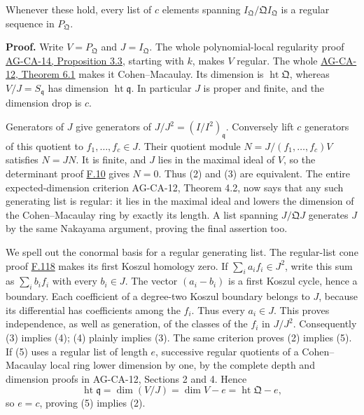 \documentclass[11pt,a4paper,openany]{report}
\begin{document}
Whenever these hold, every list of \(c\) elements spanning \(I_{\mathfrak Q}/\mathfrak QI_{\mathfrak Q}\) is a regular sequence in \(P_{\mathfrak Q}\).

\textbf{Proof.} Write \(V=P_{\mathfrak Q}\) and \(J=I_{\mathfrak Q}\). The whole polynomial-local regularity proof \href{https://github.com/KokunoYumeto/open-math-courses/blob/d02d0a3669f42579db037cd44de1d113fdd770a1/docs/courses/AG-CA/src/regular-local-rings.md}{AG-CA-14, Proposition 3.3}, starting with \(k\), makes \(V\) regular. The whole \href{https://github.com/KokunoYumeto/open-math-courses/blob/d02d0a3669f42579db037cd44de1d113fdd770a1/docs/courses/AG-CA/src/regular-sequences-depth-and-cohen-macaulay-modules.md}{AG-CA-12, Theorem 6.1} makes it Cohen--Macaulay. Its dimension is \(\operatorname{ht}\mathfrak Q\), whereas \(V/J=S_{\mathfrak q}\) has dimension \(\operatorname{ht}\mathfrak q\). In particular \(J\) is proper and finite, and the dimension drop is \(c\).

Generators of \(J\) give generators of \(J/J^2=(I/I^2)_{\mathfrak q}\). Conversely lift \(c\) generators of this quotient to \(f_1,\ldots,f_c\in J\). Their quotient module \(N=J/(f_1,\ldots,f_c)V\) satisfies \(N=JN\). It is finite, and \(J\) lies in the maximal ideal of \(V\), so the determinant proof \hyperref[AG-RG-S05-algebra-lemma-NAK]{F.10} gives \(N=0\). Thus (2) and (3) are equivalent. The entire expected-dimension criterion AG-CA-12, Theorem 4.2, now says that any such generating list is regular: it lies in the maximal ideal and lowers the dimension of the Cohen--Macaulay ring by exactly its length. A list spanning \(J/\mathfrak QJ\) generates \(J\) by the same Nakayama argument, proving the final assertion too.

We spell out the conormal basis for a regular generating list. The regular-list cone proof \hyperref[AG-RG-S05-more-algebra-lemma-noetherian-finite-all-equivalent]{F.118} makes its first Koszul homology zero. If \(\sum_i a_if_i\in J^2\), write this sum as \(\sum_i b_if_i\) with every \(b_i\in J\). The vector \((a_i-b_i)\) is a first Koszul cycle, hence a boundary. Each coefficient of a degree-two Koszul boundary belongs to \(J\), because its differential has coefficients among the \(f_i\). Thus every \(a_i\in J\). This proves independence, as well as generation, of the classes of the \(f_i\) in \(J/J^2\). Consequently (3) implies (4); (4) plainly implies (3). The same criterion proves (2) implies (5). If (5) uses a regular list of length \(e\), successive regular quotients of a Cohen--Macaulay local ring lower dimension by one, by the complete depth and dimension proofs in AG-CA-12, Sections 2 and 4. Hence \[\operatorname{ht}\mathfrak q
=\dim(V/J)=\dim V-e=\operatorname{ht}\mathfrak Q-e,\] so \(e=c\), proving (5) implies (2).
\end{document}
